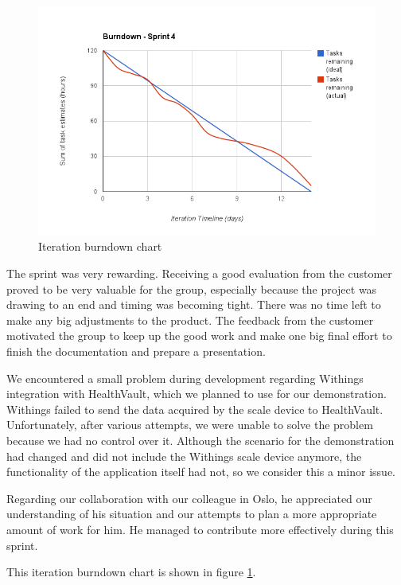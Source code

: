 \begin{figure}
\centering
\includegraphics[scale=0.60]{../Figures/burndownSprint4.png}
\caption{Iteration burndown chart}
\label{figure:burndownsprint4}
\end{figure}

The sprint was very rewarding.
Receiving a good evaluation from the customer proved to be very valuable for the group, especially because the project was drawing to an end and timing was becoming tight.
There was no time left to make any big adjustments to the product.
The feedback from the customer motivated the group to keep up the good work and make one big final effort to finish the documentation and prepare a presentation.

We encountered a small problem during development regarding Withings integration with HealthVault, which we planned to use for our demonstration. 
Withings failed to send the data acquired by the scale device to HealthVault. 
Unfortunately, after various attempts, we were unable to solve the problem because we had no control over it.
Although the scenario for the demonstration had changed and did not include the Withings scale device anymore, the functionality of the application itself had not, so we consider this a minor issue.

Regarding our collaboration with our colleague in Oslo, he appreciated our understanding of his situation and our attempts to plan a more appropriate amount of work for him. 
He managed to contribute more effectively during this sprint.

This iteration burndown chart is shown in figure \ref{figure:burndownsprint4}.

